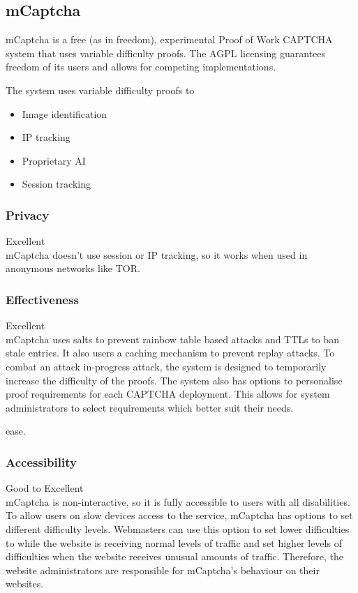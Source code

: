 \subsection{mCaptcha}

mCaptcha is a free (as in freedom), experimental Proof of Work CAPTCHA system
that uses variable difficulty proofs. The AGPL licensing guarantees freedom of
its users and allows for competing implementations.

The system uses variable difficulty proofs to 
\begin{itemize}
	\item Image identification
	\item IP tracking
	\item Proprietary AI
	\item Session tracking
\end{itemize}

\subsubsection{Privacy}
Excellent\\
mCaptcha doesn't use session or IP  tracking, so it works when used in anonymous
networks like TOR\@.

\subsubsection{Effectiveness}
Excellent\\

mCaptcha uses salts to prevent rainbow table based attacks and TTLs to ban
stale entries. It also users a caching mechanism to prevent replay attacks. To
combat an attack in-progress attack, the system is designed to temporarily 
increase the difficulty of the proofs. The system also has options to
personalise proof requirements for each CAPTCHA deployment. This allows for
system administrators to select requirements which better suit their needs. 

ease.
\subsubsection{Accessibility}
Good to Excellent\\

mCaptcha is non-interactive, so it is fully accessible to users with all
disabilities. To allow users on slow devices access to the service, mCaptcha has
options to set different difficulty levels. Webmasters can use this option to
set lower difficulties to while the website is receiving normal levels of
traffic and set higher levels of difficulties when the website receives unusual
amounts of traffic. Therefore, the website administrators are responsible for
mCaptcha's behaviour on their websites.

